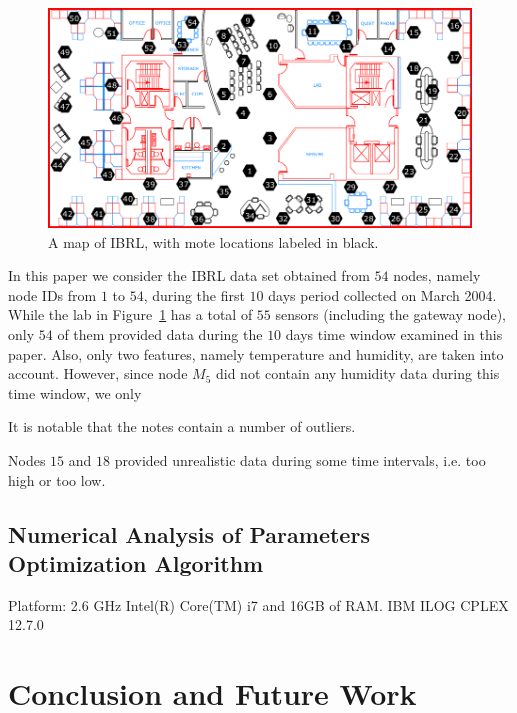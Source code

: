 \documentclass[3p,times]{elsarticle}
\begin{document}
\begin{figure}[H]
\centering
\includegraphics[scale=.3]{Pictures/ibrl_wsn}
\caption{A map of IBRL, with mote locations labeled in black.}
\label{fig:ibrl_wsn}
\end{figure}

In this paper we consider the IBRL data set obtained from $54$ nodes, namely node IDs from $1$ to $54$, during the first $10$ days period collected on March 2004. While the lab in Figure~\ref{fig:ibrl_wsn} has a total of $55$ sensors (including the gateway node), only $54$ of them provided data during the $10$ days time window examined in this paper. Also, only two features, namely temperature and humidity, are taken into account. However, since node $M_5$ did not contain any humidity data during this time window, we only 

It is notable that the notes contain a number of outliers.

Nodes $15$ and $18$ provided unrealistic data during some time intervals, i.e. too high or too low. 

\subsection{Numerical Analysis of Parameters Optimization Algorithm}

Platform: 2.6 GHz Intel(R) Core(TM) i7 and 16GB of RAM.
IBM ILOG CPLEX 12.7.0

\section{Conclusion and Future Work}



\end{document}
